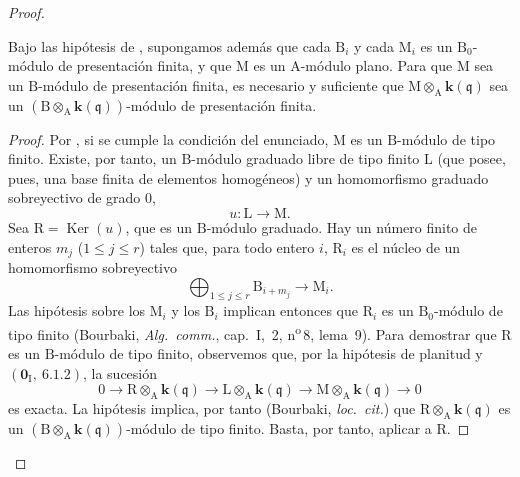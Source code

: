 \begin{proof}
\begin{corollary}[11.2.9.4]
\label{IV.11.2.9.4}
Bajo las hipótesis de , supongamos además que cada $\mathrm{B}_i$ y cada $\mathrm{M}_i$ es un $\mathrm{B}_0$-módulo de presentación finita, y que $\mathrm{M}$ es un $\mathrm{A}$-módulo plano. Para que $\mathrm{M}$ sea un $\mathrm{B}$-módulo de presentación finita, es necesario y suficiente que $\mathrm{M}\otimes_\mathrm{A}\boldsymbol{k}(\mathfrak{q})$ sea un $(\mathrm{B}\otimes_\mathrm{A}\boldsymbol{k}(\mathfrak{q}))$-módulo de presentación finita.
\end{corollary}

\begin{proof}
Por , si se cumple la condición del enunciado,
$\mathrm{M}$ es un $\mathrm{B}$-módulo de tipo finito. Existe, por tanto, un
$\mathrm{B}$-módulo graduado libre de tipo finito $\mathrm{L}$ (que posee,
pues, una base finita de elementos homogéneos) y un homomorfismo graduado
sobreyectivo de grado $0$,
\[
 u:\mathrm{L}\longrightarrow\mathrm{M}.
\]
Sea $\mathrm{R}=\operatorname{Ker}(u)$, que es un
$\mathrm{B}$-módulo graduado. Hay un número finito de enteros $m_j$
($1\leqslant j\leqslant r$) tales que, para todo entero $i$,
$\mathrm{R}_i$ es el núcleo de un homomorfismo sobreyectivo
\[
 \bigoplus_{1\leqslant j\leqslant r}\mathrm{B}_{i+m_j}
 \longrightarrow \mathrm{M}_i.
\]
Las hipótesis sobre los $\mathrm{M}_i$ y los $\mathrm{B}_i$ implican entonces
que $\mathrm{R}_i$ es un $\mathrm{B}_0$-módulo de tipo finito
(Bourbaki, \emph{Alg.\ comm.}, cap.~I,
\textsection\,2, n\textsuperscript{o}\,8, lema~9). Para demostrar que
$\mathrm{R}$ es un $\mathrm{B}$-módulo de tipo finito, observemos que,
por la hipótesis de planitud y $(\mathbf{0}_\mathrm{I},~6.1.2)$, la
sucesión
\[
 0\longrightarrow
 \mathrm{R}\otimes_\mathrm{A}\boldsymbol{k}(\mathfrak{q})
 \longrightarrow
 \mathrm{L}\otimes_\mathrm{A}\boldsymbol{k}(\mathfrak{q})
 \longrightarrow
 \mathrm{M}\otimes_\mathrm{A}\boldsymbol{k}(\mathfrak{q})
 \longrightarrow 0
\]
es exacta. La hipótesis implica, por tanto (Bourbaki,
\emph{loc.\ cit.}) que
$\mathrm{R}\otimes_\mathrm{A}\boldsymbol{k}(\mathfrak{q})$ es un
$(\mathrm{B}\otimes_\mathrm{A}\boldsymbol{k}(\mathfrak{q}))$-módulo
de tipo finito. Basta, por tanto, aplicar  a $\mathrm{R}$.
\end{proof}


\end{proof}
